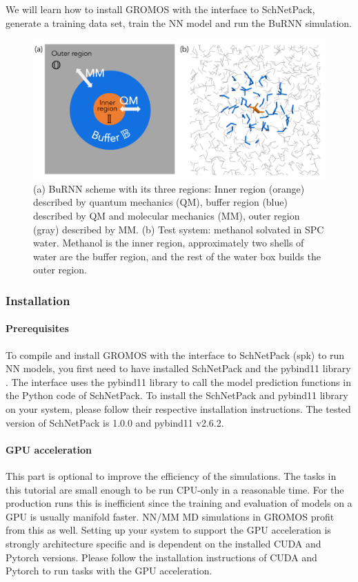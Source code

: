 We will learn how to install GROMOS with the interface to SchNetPack, generate a training data set, train the NN model and run the BuRNN simulation.


\begin{figure}[H]
\centering
\includegraphics[scale=.33]{../09_tutorial_06/figures/BuRNN_scheme}
\caption{(a) BuRNN scheme with its three regions: Inner region (orange) described by quantum mechanics (QM), buffer region (blue) described by QM and molecular mechanics (MM), outer region (gray) described by MM. (b) Test system: methanol solvated in SPC water. Methanol is the inner region, approximately two shells of water are the buffer region, and the rest of the water box builds the outer region.}
\label{BuRNN_scheme}
\end{figure}


\subsubsection{Installation}
\paragraph{Prerequisites}
To compile and install GROMOS with the interface to SchNetPack (spk) to run NN models, you first need to have installed SchNetPack and the pybind11 library \cite{pybind11}. The interface uses the pybind11 library to call the model prediction functions in the Python code of SchNetPack. To install the SchNetPack and pybind11 library on your system, please follow their respective installation instructions. The tested version of SchNetPack is 1.0.0 and pybind11 v2.6.2.

\paragraph{GPU acceleration}
This part is optional to improve the efficiency of the simulations. The tasks in this tutorial are small enough to be run CPU-only in a reasonable time. For the production runs this is inefficient since the training and evaluation of models on a GPU is usually manifold faster. NN/MM MD simulations in GROMOS profit from this as well. Setting up your system to support the GPU acceleration is strongly architecture specific and is dependent on the installed CUDA and Pytorch versions. Please follow the installation instructions of CUDA and Pytorch to run tasks with the GPU acceleration.

